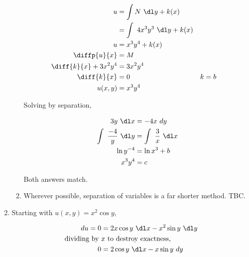 \begin{enumerate}
\begin{enumerate}
                    \begin{align}
                        u                         & = \int N\ \dl y+ k(x)                      \\
                                                  & = \int\ 4x^{3}y^{3}\ \dl y+ k(x)           \\
                        u                         & = x^{3}y^{4} + k(x)                        \\
                        \diffp{u}{x}              & = M                                        \\
                        \diff{k}{x} + 3x^{2}y^{4} & = 3x^{2}y^{4}                              \\
                        \diff{k}{x}               & = 0                              & k & = b \\
                        u(x, y)                   & = x^{3}y^{4}
                    \end{align}

                    Solving by separation,

                    \begin{align}
                        3y\ \dl x                 & = -4x\ dy                  \\
                        \int\ \frac{-4}{y}\ \dl y & = \int\ \frac{3}{x}\ \dl x \\
                        \ln y^{-4}                & = \ln x^{3} + b            \\
                        x^{3}y^{4}                & = c
                    \end{align}

                    Both answers match.
              \item  Wherever possible, separation of variables is a far shorter method. TBC.
          \end{enumerate}
    \item Starting with $ u(x, y) = x^{2} \cos y $,

          \begin{align}
              du = 0               & = 2x \cos y\ \dl x - x^{2} \sin y\ \dl y \\
              \text{dividing by}\  & x\ \text{to destroy exactness,}          \\
              0                    & = 2\cos y\ \dl x - x\sin y \ dy
          \end{align}


\end{enumerate}
